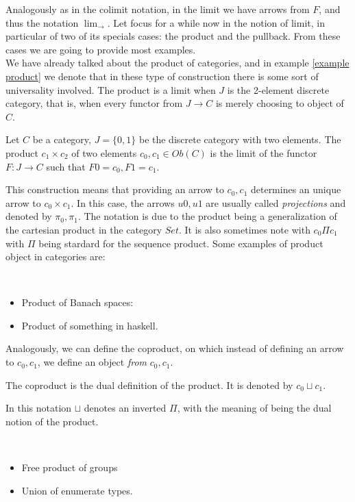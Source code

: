Analogously as in the colimit notation, in the limit we have arrows from $F$, and thus the notation $\lim_{\rightarrow}$. Let focus for a while now in the notion of limit, in particular of two of its specials cases: the product and the pullback. From these cases we are going to provide most examples. \\

We have already talked about the product of categories, and in example \ref{example product} we denote that in these type of construction there is some sort of universality involved. The product is a limit when $J$ is the 2-element discrete category, that is, when every functor from $J\to C$ is merely choosing to object of $C$. 

\begin{definition}\label{prod-univ}
  Let $C$ be a category, $J=\{0,1\}$ be the discrete category with two elements. The product $c_1\times c_2$ of two elements $c_0,c_1\in Ob(C)$ is the limit of the functor $F:J\to C$ such that $F0 = c_0, F1= c_1$.
\end{definition}

This construction means that providing an arrow to $c_0,c_1$ determines an unique arrow to $c_0\times c_1$. In this case, the arrows $u0, u1$ are usually called \emph{projections} and denoted by $\pi_0, \pi_1$. The notation is due to the product being a generalization of the cartesian product in the category $Set$. It is also sometimes note with $c_0 \Pi c_1$ with $\Pi$ being stardard for the sequence product. Some examples of product object in categories are:
\begin{example}\ 
\begin{itemize}
\item Product of Banach spaces:
\item Product of something in haskell.
\end{itemize}
\end{example}

Analogously, we can define the coproduct, on which instead of defining an arrow to $c_0, c_1$, we define an object \emph{from} $c_0,c_1$. 
\begin{definition}
  The coproduct is the dual definition of the product. It is denoted by $c_0 \sqcup c_1$.
\end{definition}
 In this notation $\sqcup$ denotes an inverted $\Pi$, with the meaning of being the dual notion of the product.
\begin{example}\ 
  \begin{itemize}
  \item Free product of groups
  \item Union of enumerate types.
  \end{itemize}
\end{example}



